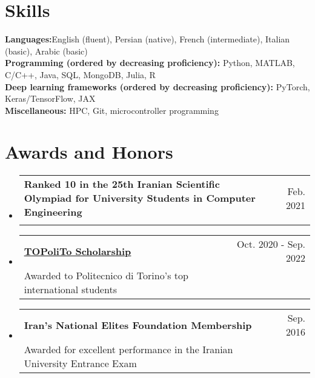 \documentclass[A4,11pt]{article}
\makeatletter
\newcommand{\CVSubheading}[4]{
  \vspace{-2pt}\item
    \begin{tabular*}{0.97\textwidth}[t]{l@{\extracolsep{\fill}}r}
      \textbf{#1} & #2 \\
      \small#3 & \small #4 \\
    \end{tabular*}\vspace{-7pt}
}
\newcommand{\CVSubHeadingListStart}{\begin{itemize}[leftmargin=0.5cm, label={}]}
\newcommand{\CVSubHeadingListEnd}{\end{itemize}}
\makeatother
\begin{document}

\section{Skills}
 \begin{itemize}[leftmargin=0.5cm, label={}]
    \small{\item{
     \textbf{Languages:}{English (fluent), Persian (native), French (intermediate), Italian (basic), Arabic (basic)} \\
     \textbf{Programming (ordered by decreasing proficiency): }{Python, MATLAB, C/C++, Java, SQL, MongoDB, Julia, R} \\
     \textbf{Deep learning frameworks (ordered by decreasing proficiency): }{PyTorch, Keras/TensorFlow, JAX} \\
     \textbf{Miscellaneous: }{HPC, Git, microcontroller programming} \\
    }}
 \end{itemize}
    


\section{Awards and Honors}
  \CVSubHeadingListStart
     \CVSubheading
      {\small{Ranked 10 in the 25th Iranian Scientific Olympiad for University Students in Computer Engineering}}{\small{Feb. 2021}}{}{}
      \CVSubheading
      {\href{https://international.polito.it/financial_aid/topolito_scholarships}{\underline{\small{TOPoliTo Scholarship}}}}{\small{Oct. 2020 - Sep. 2022}}
      {\small{Awarded to Politecnico di Torino's top international students}}{}
      \CVSubheading
      {\small{Iran's National Elites Foundation Membership}}{\small{Sep. 2016}}
      {\small{Awarded for excellent performance in the Iranian University Entrance Exam}}{}
  \CVSubHeadingListEnd    
    

\end{document}
